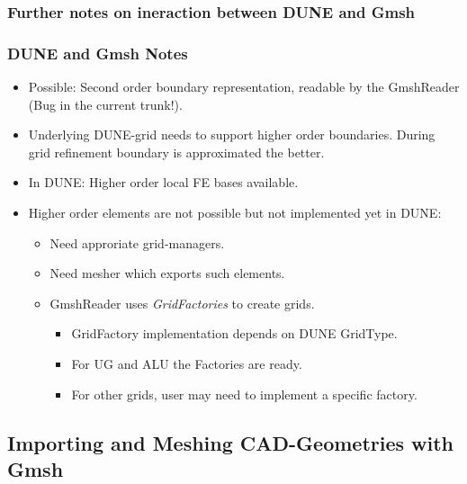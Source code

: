 \subsubsection*{Further notes on ineraction between DUNE and Gmsh}

\begin{frame}
  \frametitle{DUNE and Gmsh Notes}
  \begin{itemize}
    \item Possible: Second order boundary representation, readable by the
      GmshReader (Bug in the current trunk!).
    \item Underlying DUNE-grid needs to support higher order boundaries. During grid
      refinement boundary is approximated the better.
    \item In DUNE: Higher order local FE bases available.
    \item Higher order elements are not possible but not implemented yet in DUNE:
      \begin{itemize}
        \item Need approriate grid-managers.
        \item Need mesher which exports such elements.
        \item GmshReader uses \emph{GridFactories} to create grids.
          \begin{itemize}
            \item GridFactory implementation depends on DUNE GridType.
            \item For UG and ALU the Factories are ready.
            \item For other grids, user may need to implement a specific factory.
          \end{itemize}
      \end{itemize}
  \end{itemize}
\end{frame}

\subsection{Importing and Meshing CAD-Geometries with Gmsh}

